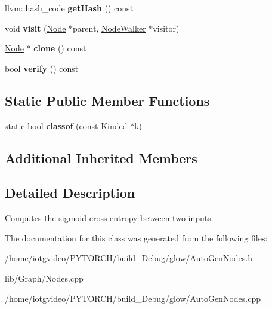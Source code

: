 \begin{DoxyCompactItemize}
\item 
\mbox{\label{classglow_1_1_sigmoid_cross_entropy_with_logits_node_a3dc5a27e99c3494618adba21f515692e}} 
llvm\+::hash\+\_\+code {\bfseries get\+Hash} () const
\item 
\mbox{\label{classglow_1_1_sigmoid_cross_entropy_with_logits_node_ade74debcc7d8a01c258dd392d49aa122}} 
void {\bfseries visit} (\hyperlink{classglow_1_1_node}{Node} $\ast$parent, \hyperlink{classglow_1_1_node_walker}{Node\+Walker} $\ast$visitor)
\item 
\mbox{\label{classglow_1_1_sigmoid_cross_entropy_with_logits_node_ae5587d0a7fbaa4fa9298c34267fd53d1}} 
\hyperlink{classglow_1_1_node}{Node} $\ast$ {\bfseries clone} () const
\item 
\mbox{\label{classglow_1_1_sigmoid_cross_entropy_with_logits_node_a28668320d09bab914602a2d7e909234a}} 
bool {\bfseries verify} () const
\end{DoxyCompactItemize}
\subsection*{Static Public Member Functions}
\begin{DoxyCompactItemize}
\item 
\mbox{\label{classglow_1_1_sigmoid_cross_entropy_with_logits_node_a7b31c299de83fe41d56afbb5786233fe}} 
static bool {\bfseries classof} (const \hyperlink{classglow_1_1_kinded}{Kinded} $\ast$k)
\end{DoxyCompactItemize}
\subsection*{Additional Inherited Members}


\subsection{Detailed Description}
Computes the sigmoid cross entropy between two inputs. 

The documentation for this class was generated from the following files\+:\begin{DoxyCompactItemize}
\item 
/home/iotgvideo/\+P\+Y\+T\+O\+R\+C\+H/build\+\_\+\+Debug/glow/Auto\+Gen\+Nodes.\+h\item 
lib/\+Graph/Nodes.\+cpp\item 
/home/iotgvideo/\+P\+Y\+T\+O\+R\+C\+H/build\+\_\+\+Debug/glow/Auto\+Gen\+Nodes.\+cpp\end{DoxyCompactItemize}
